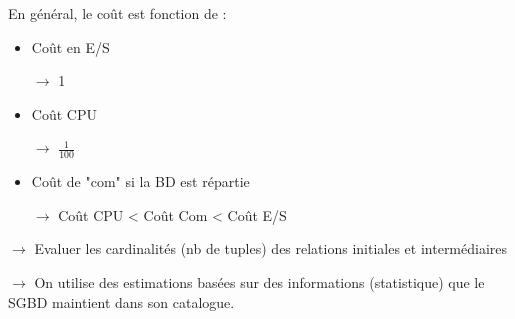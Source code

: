 \documentclass{article}
\begin{document}
En général, le coût est fonction de :
\begin{itemize}
	\item Coût en E/S 

$\rightarrow$ 1
	\item Coût CPU

 $\rightarrow$ $\frac{1}{100}$
	\item Coût de "com" si la BD est répartie 

$\rightarrow$ Coût CPU < Coût Com < Coût E/S
\end{itemize}

$\rightarrow$ Evaluer les cardinalités (nb de tuples) des relations initiales et intermédiaires

$\rightarrow$ On utilise des estimations basées sur des informations (statistique) que le SGBD maintient dans son catalogue.
\end{document}
